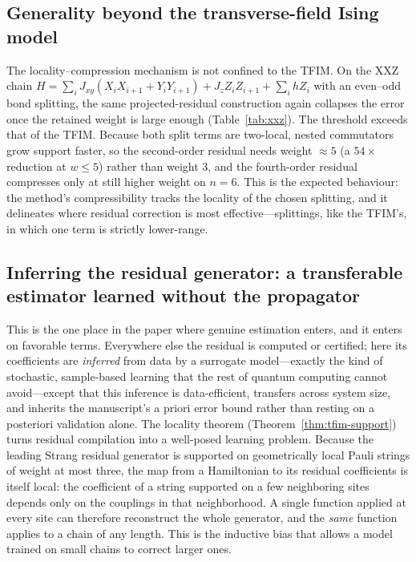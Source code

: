 \documentclass[aps,prresearch,reprint,superscriptaddress,nofootinbib,amsmath,amssymb]{revtex4-2}
\newcommand{\tfim}{TFIM}
\begin{document}
\subsection{Generality beyond the transverse-field Ising model}
\label{sec:xxz}

The locality--compression mechanism is not confined to the \tfim{}. On the XXZ chain $H=\sum_i J_{xy}(X_iX_{i+1}+Y_iY_{i+1})+J_z Z_iZ_{i+1}+\sum_i hZ_i$ with an even--odd bond splitting, the same projected-residual construction again collapses the error once the retained weight is large enough (Table~\ref{tab:xxz}). The threshold exceeds that of the \tfim{}. Because both split terms are two-local, nested commutators grow support faster, so the second-order residual needs weight $\approx5$ (a $54\times$ reduction at $w\leq5$) rather than weight $3$, and the fourth-order residual compresses only at still higher weight on $n=6$. This is the expected behaviour: the method's compressibility tracks the locality of the chosen splitting, and it delineates where residual correction is most effective---splittings, like the \tfim{}'s, in which one term is strictly lower-range.



\subsection{Inferring the residual generator: a transferable estimator learned without the propagator}
\label{sec:learned}

This is the one place in the paper where genuine estimation enters, and it enters on favorable terms. Everywhere else the residual is computed or certified; here its coefficients are \emph{inferred} from data by a surrogate model---exactly the kind of stochastic, sample-based learning that the rest of quantum computing cannot avoid---except that this inference is data-efficient, transfers across system size, and inherits the manuscript's a priori error bound rather than resting on a posteriori validation alone. The locality theorem (Theorem~\ref{thm:tfim-support}) turns residual compilation into a well-posed learning problem. Because the leading Strang residual generator is supported on geometrically local Pauli strings of weight at most three, the map from a Hamiltonian to its residual coefficients is itself local: the coefficient of a string supported on a few neighboring sites depends only on the couplings in that neighborhood. A single function applied at every site can therefore reconstruct the whole generator, and the \emph{same} function applies to a chain of any length. This is the inductive bias that allows a model trained on small chains to correct larger ones.
\end{document}
